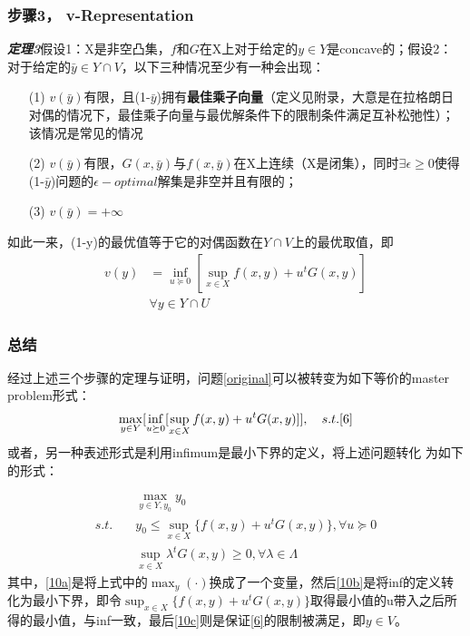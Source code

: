 \documentclass[UTF8,a4]{article}
\begin{document}
\subsubsection{步骤3， v-Representation}
\textbf{\emph{定理3}}假设1：X是非空凸集，$f$和$G$在X上对于给定的$y\in Y$是concave的；假设2：对于给定的$\bar{y}\in Y\cap V$，以下三种情况至少有一种会出现：
\begin{itemize}
\item[(1)]$v(\bar{y})$有限，且(1-$\bar{y}$)拥有\textbf{最佳乘子向量}（定义见附录，大意是在拉格朗日对偶的情况下，最佳乘子向量与最优解条件下的限制条件满足互补松弛性）；该情况是常见的情况
\item[(2)]$v(\bar{y})$有限，$G(x,\bar{y})$与$f(x,\bar{y})$在X上连续（X是闭集），同时$\exists \epsilon\geqslant 0$使得(1-$\bar{y}$)问题的$\epsilon-optimal$解集是非空并且有限的；
\item[(3)]$v(\bar{y})=+\infty$
\end{itemize}
如此一来，(1-y)的最优值等于它的对偶函数在$Y\cap V$上的最优取值，即
\begin{equation}
\label{9}
\begin{split}
v(y)&=\inf_{u\succeq0}[\sup_{x\in X}f(x,y)+u^tG(x,y)]\\
&\forall y\in Y\cap U
\end{split}
\end{equation}
\subsubsection{总结}
经过上述三个步骤的定理与证明，问题\eqref{original}可以被转变为如下等价的master problem形式：
$$
\max_{y\in Y}[\inf_{u\succeq0}[\sup_{x\in X}f(x,y)+u^tG(x,y)]],\quad s.t. \eqref{6}
$$
或者，另一种表述形式是利用infimum是最小下界的定义，将上述问题转化
为如下的形式：

\begin{subequations}
\label{10}
\begin{align}
\label{10a}
&\max_{y\in Y,y_0}y_0\\
\label{10b}
s.t.\quad &y_0\leqslant\sup_{x\in X}\{f(x,y)+u^tG(x,y)\},\forall u\succeq0\\
\label{10c}
&\sup_{x\in X}{\lambda^tG(x,y)}\geqslant0, \forall\lambda\in\Lambda
\end{align}
\end{subequations}
其中，\eqref{10a}是将上式中的$\max_{y}(\cdot)$换成了一个变量，然后\eqref{10b}是将inf的定义转化为最小下界，即令$\sup_{x\in X}\{f(x,y)+u^tG(x,y)\}$取得最小值的u带入之后所得的最小值，与inf一致，最后\eqref{10c}则是保证\eqref{6}的限制被满足，即$y\in V$。
\end{document}
